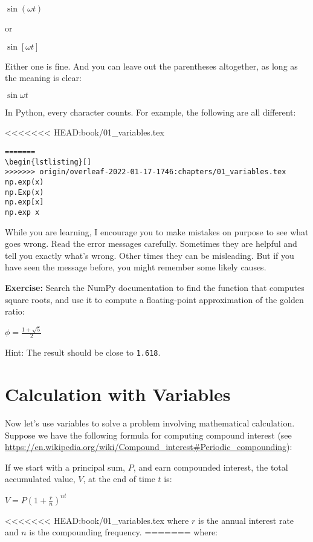 \(\sin (\omega t)\)

or

\(\sin [\omega t]\)

Either one is fine. And you can leave out the parentheses altogether, as
long as the meaning is clear:

\(\sin \omega t\)

In Python, every character counts. For example, the following are all
different:

<<<<<<< HEAD:book/01_variables.tex
\begin{lstlisting}
=======
\begin{lstlisting}[]
>>>>>>> origin/overleaf-2022-01-17-1746:chapters/01_variables.tex
np.exp(x)
np.Exp(x)
np.exp[x]
np.exp x
\end{lstlisting}

While you are learning, I encourage you to make mistakes on purpose to
see what goes wrong. Read the error messages carefully. Sometimes they
are helpful and tell you exactly what's wrong. Other times they can be
misleading. But if you have seen the message before, you might remember
some likely causes.

\textbf{Exercise:} Search the NumPy documentation to find the function
that computes square roots, and use it to compute a floating-point
approximation of the golden ratio:

\(\phi = \frac{1 + \sqrt{5}}{2}\)

Hint: The result should be close to \passthrough{\lstinline!1.618!}.

\hypertarget{calculation-with-variables}{%
\section{Calculation with Variables}\label{calculation-with-variables}}

Now let's use variables to solve a problem involving mathematical
calculation. Suppose we have the following formula for computing
compound interest (see
\url{https://en.wikipedia.org/wiki/Compound_interest\#Periodic_compounding}):

If we start with a principal sum, \(P\), and earn compounded interest,
the total accumulated value, \(V\), at the end of time \(t\) is:

\(V=P\left(1+{\frac {r}{n}}\right)^{nt}\)

<<<<<<< HEAD:book/01_variables.tex
where \(r\) is the annual interest rate and \(n\) is the compounding
frequency.
=======
where:


